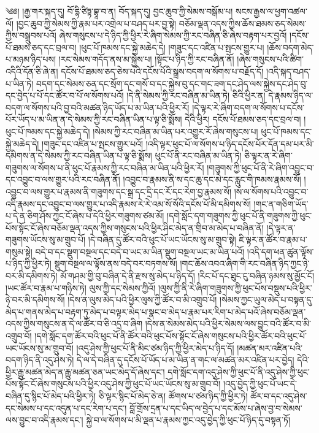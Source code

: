 \setcounter{footnote}{0} 
༄༅། །རྒྱ་གར་སྐད་དུ། བོ་དྷི་ཙིཏྟ་བྷཱ་བ་ན། བོད་སྐད་དུ། བྱང་ཆུབ་ཀྱི་སེམས་བསྒོམ་པ། སངས་རྒྱས་ལ་ཕྱག་འཚལ་ལོ། །བྱང་ཆུབ་ཀྱི་སེམས་ཀྱི་རྣམ་པར་འགྲེལ་པ་བཤད་པར་བྱ་སྟེ། བཅོམ་ལྡན་འདས་ཀྱིས་ཆོས་ཐམས་ཅད་སེམས་ཀྱིས་བསྒྲུབས་པའོ། ཞེས་གསུངས་པ་དེ་ཉིད་ཀྱི་ཕྱིར་རེ་ཞིག་སེམས་ཀྱི་རང་བཞིན་ཅི་ཞེས་བརྟག་པར་བྱའོ། །དངོས་པོ་ཐམས་ཅད་དང་བྲལ་བ། །ཕུང་པོ་ཁམས་དང་སྐྱེ་མཆེད་དེ། །གཟུང་དང་འཛིན་པ་སྤངས་གྱུར་པ། །ཆོས་བདག་མེད་པ་མཉམ་ཉིད་པས། །རང་སེམས་གདོད་ནས་མ་སྐྱེས་པ། །སྟོང་པ་ཉིད་ཀྱི་རང་བཞིན་ནོ། །ཞེས་གསུངས་པའི་ཚིག་འདིའི་དོན་ཅི་ཞེ་ན། དངོས་པོ་ཐམས་ཅད་ཅེས་པའི་དངོས་པོའི་སྒྲས་བདག་ལ་སོགས་པ་བརྗོད་དོ། །འདི་སྐད་བཤད་པ་ཡིན་ཏེ། བདག་དང་སེམས་ཅན་དང་སྲོག་དང་གསོ་བ་དང་སྐྱེས་བུ་དང་གང་ཟག་དང་ཤེད་ལས་སྐྱེས་དང་ཤེད་བུ་དང་བྱེད་པ་པོ་དང་ཚོར་བ་པོ་ལ་སོགས་པའོ། །དེ་ནི་སེམས་ཀྱི་རང་བཞིན་མ་ཡིན་ཏེ། ཅིའི་ཕྱིར་ན། དེ་རྣམས་ཉིད་ལ་བདག་ལ་སོགས་པའི་བྱ་བའི་མཚན་ཉིད་ཡོད་པ་མ་ཡིན་པའི་ཕྱིར་རོ། །དེ་ལྟར་རེ་ཞིག་བདག་ལ་སོགས་པ་དངོས་པོར་ཡོད་པ་མ་ཡིན་ན་དེ་སེམས་ཀྱི་རང་བཞིན་ཡིན་པ་ལྟ་ཅི་སྨོས། དེའི་ཕྱིར། དངོས་པོ་ཐམས་ཅད་དང་བྲལ་བ། །ཕུང་པོ་ཁམས་དང་སྐྱེ་མཆེད་དེ། །སེམས་ཀྱི་རང་བཞིན་མ་ཡིན་པར་འགྱུར་རོ་ཞེས་གསུངས་པ། ཕུང་པོ་ཁམས་དང་སྐྱེ་མཆེད་དེ། །གཟུང་དང་འཛིན་པ་སྤངས་གྱུར་པའོ། །འདི་ལྟར་ཕུང་པོ་ལ་སོགས་པ་ཉིད་དངོས་པོར་དོན་དམ་པར་མི་དམིགས་ན་དེ་སེམས་ཀྱི་རང་བཞིན་ཡིན་པ་ལྟ་ཅི་སྨོས། ཕུང་པོ་ནི་རང་བཞིན་མ་ཡིན་ཏེ། ཅི་ལྟར་ན་རེ་ཞིག་གཟུགས་ལ་སོགས་པ་ནི་ཕུང་པོ་རྣམས་ཀྱི་རང་བཞིན་མ་ཡིན་པའི་ཕྱིར་རོ། །གཟུགས་ཀྱི་ཕུང་པོ་ནི་རེ་ཞིག་འབྱུང་བ་དང་འབྱུང་བ་ལས་གྱུར་པའི་རང་བཞིན་ནོ། །འབྱུང་བ་རྣམས་ནི་ས་དང་ཆུ་དང་མེ་དང་རླུང་གི་ཁམས་རྣམས་སོ། །འབྱུང་བ་ལས་གྱུར་པ་རྣམས་ནི་གཟུགས་དང་སྒྲ་དང་དྲི་དང་རོ་དང་རེག་བྱ་རྣམས་སོ། །ས་ལ་སོགས་པའི་འབྱུང་བ་འདི་རྣམས་དང་འབྱུང་བ་ལས་གྱུར་པ་འདི་རྣམས་རེ་རེ་འམ་སོ་སོའི་དངོས་པོ་མི་དམིགས་སོ། །གང་ན་གཅིག་ཡོད་པ་དེ་ན་ཅིག་ཤོས་ཀྱང་ངོ་ཞེས་པ་དེའི་ཕྱིར་གཟུགས་ཙམ་མོ། །དགེ་སློང་དག་གཟུགས་ཀྱི་ཕུང་པོ་ནི་གཟུགས་ཀྱི་ཕུང་པོས་སྟོང་ངོ་ཞེས་བཅོམ་ལྡན་འདས་ཀྱིས་གསུངས་པའི་ཕྱིར་ཤིང་མེད་ན་གྲིབ་མ་མེད་པ་བཞིན་ནོ། །དེ་ལྟར་ན་གཟུགས་ཡོངས་སུ་མ་གྲུབ་པོ། །དེ་བཞིན་དུ་ཚོར་བའི་ཕུང་པོ་ཡང་ཡོངས་སུ་མ་གྲུབ་སྟེ། ཇི་ལྟར་ན་ཚོར་བ་རྣམ་པ་གསུམ་སྟེ། བདེ་བ་དང་སྡུག་བསྔལ་དང་བདེ་བ་ཡང་མ་ཡིན་སྡུག་བསྔལ་ཡང་མ་ཡིན་པའོ། །འདི་དག་ཕན་ཚུན་ལྟོས་པ་ཉིད་ཀྱི་ཕྱིར་ཏེ། སྡུག་བསྔལ་ལ་ལྟོས་ནས་བདེ་བར་བཏགས་སོ། །གང་ཆོས་འབའ་ཞིག་གི་རང་བཞིན་ཉིད་ཀྱང་ཉེ་བར་མི་དམིགས་ཏེ། མོ་གཤམ་གྱི་བུ་བཞིན་དེ་ནི་རྫས་སུ་མེད་པ་ཉིད་དོ། །རིང་པོ་དང་ཐུང་ངུ་བཞིན་ཉམས་སུ་མྱོང་ངོ། །ཡང་ཚོར་བ་རྣམ་པ་གཉིས་ཏེ། ལུས་ཀྱི་དང་སེམས་ཀྱིའོ། །ལུས་ཀྱི་ནི་རེ་ཞིག་གཟུགས་ཀྱི་ཕུང་པོས་བསྡུས་པའི་ཕྱིར་ཉེ་བར་མི་དམིགས་སོ། །དེས་ན་ལུས་མེད་པའི་ཕྱིར་ལུས་ཀྱི་ཚོར་བ་མི་འགྲུབ་པོ། །སེམས་ཀྱང་ཡུལ་མེད་པ་བསྟན་དུ་མེད་པ་གནས་མེད་པ་བརྟག་ཏུ་མེད་པ་བལྟར་མེད་པ་སྣང་བ་མེད་པ་རྣམ་པར་རིག་པ་མེད་པའོ་ཞེས་བཅོམ་ལྡན་འདས་ཀྱིས་གསུངས་ན་དེ་ལ་ཚོར་བ་ཅི་འདྲ་བ་ཞིག །དེས་ན་སེམས་མེད་པའི་ཕྱིར་སེམས་ལས་བྱུང་བའི་ཚོར་བ་མི་འགྲུབ་བོ། །དགེ་སློང་དག་ཚོར་བའི་ཕུང་པོ་ནི་ཚོར་བའི་ཕུང་པོས་སྟོང་ངོ་ཞེས་གསུངས་པའི་ཕྱིར་ཚོར་བའི་ཕུང་པོ་ཡང་ཡོངས་སུ་མ་གྲུབ་བོ། །འདུ་ཤེས་ཀྱི་ཕུང་པོ་ནི་མིང་ཙམ་ཉིད་ཀྱི་ཕྱིར་མེད་པ་ཉིད་དོ། །མཚན་མར་འཛིན་པའི་བདག་ཉིད་ནི་འདུ་ཤེས་ཏེ། དེ་ལ་དེ་བཞིན་དུ་དངོས་པོ་ཡོད་པ་མ་ཡིན་ན་གང་ལ་མཚན་མར་འཛིན་པར་བྱེད། དེའི་ཕྱིར་རྒྱུ་མཚན་མེད་ན་རྒྱུ་མཚན་ཅན་ཡང་མེད་དོ་ཞེས་དང་། དགེ་སློང་དག་འདུ་ཤེས་ཀྱི་ཕུང་པོ་ནི་འདུ་ཤེས་ཀྱི་ཕུང་པོས་སྟོང་ངོ་ཞེས་གསུངས་པའི་ཕྱིར་འདུ་ཤེས་ཀྱི་ཕུང་པོ་ཡང་ཡོངས་སུ་མ་གྲུབ་བོ། །འདུ་བྱེད་ཀྱི་ཕུང་པོ་ཡང་དེ་བཞིན་དུ་སྙིང་པོ་མེད་པའི་ཕྱིར་ཏེ། ཅི་ལྟར་སྙིང་པོ་མེད་ཅེ་ན། ཚོགས་པ་ཙམ་ཉིད་ཀྱི་ཕྱིར་ཏེ། ཚོར་བ་དང་འདུ་ཤེས་དང་སེམས་པ་དང་འདུན་པ་དང་རེག་པ་དང་། བློ་གྲོས་དྲན་པ་དང་ཡིད་ལ་བྱེད་པ་དང་མོས་པ་ཞེས་བྱ་བ་སེམས་ལས་བྱུང་བ་འདི་རྣམས་དང་། སྐྱེ་བ་ལ་སོགས་པ་མི་ལྡན་པ་རྣམས་ཀྱང་འདུ་བྱེད་ཀྱི་ཕུང་པོ་ཉིད་དུ་བསྟན་ཏོ། 